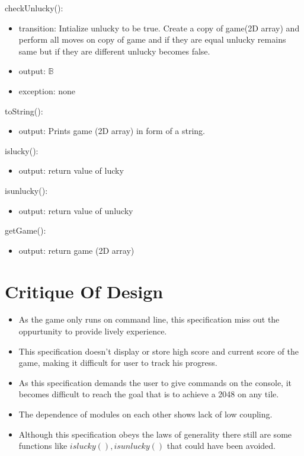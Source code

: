 \documentclass[12pt]{article}
\begin{document}
\noindent checkUnlucky():
\begin{itemize}
  \item transition: Intialize unlucky to be true. Create a copy of game(2D array) and perform all moves on copy of game and if they are equal unlucky remains same but if they are different unlucky becomes false.
  \item output: $\mathbb{B}$
  \item exception: none
\end{itemize}

\noindent toString():
\begin{itemize}
  \item output: Prints game (2D array) in form of a string.
\end{itemize}

\noindent islucky():
\begin{itemize}
  \item output: return value of lucky
\end{itemize}

\noindent isunlucky():
\begin{itemize}
  \item output: return value of unlucky
\end{itemize}

\noindent getGame():
\begin{itemize}
  \item output: return game (2D array)
\end{itemize}

\newpage
\section*{Critique Of Design}
\begin{itemize}
  \item As the game only runs on command line, this specification miss out the oppurtunity to provide lively experience.\\
  \item This specification doesn't display or store high score and current score of the game, making it difficult for user to track his progress.\\
  \item As this specification demands the user to give commands on the console, it becomes difficult to reach the goal that is to achieve a 2048 on any tile.\\
  \item The dependence of modules on each other shows lack of low coupling.\\
  \item Although this specification obeys the laws of generality there still are some functions like $islucky(), isunlucky()$ that could have been avoided.\\
\end{itemize}
\end{document}
